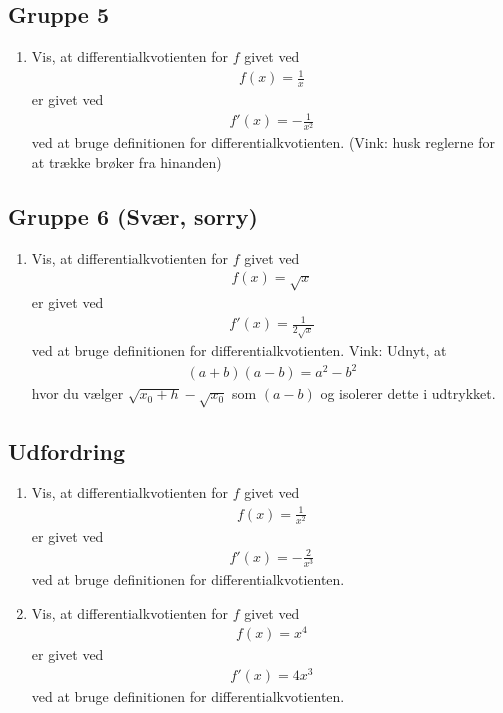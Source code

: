 \subsection*{Gruppe 5}
\begin{enumerate}[label=\roman*)]
	\item Vis, at differentialkvotienten for $f$ givet ved
	\begin{align*}
		f(x) = \frac{1}{x}
	\end{align*}
	er givet ved
	\begin{align*}
		f'(x) = -\frac{1}{x^2}
	\end{align*}
	ved at bruge definitionen for differentialkvotienten. (Vink: husk reglerne for at trække brøker 
	fra hinanden)
\end{enumerate}

\subsection*{Gruppe 6 (Svær, sorry)}
\begin{enumerate}[label=\roman*)]
	\item Vis, at differentialkvotienten for $f$ givet ved
	\begin{align*}
		f(x) = \sqrt{x}
	\end{align*}
	er givet ved
	\begin{align*}
		f'(x) = \frac{1}{2\sqrt{x}}
	\end{align*}
	ved at bruge definitionen for differentialkvotienten. Vink: Udnyt, at 
	\begin{align*}
		(a+b)(a-b) = a^2 - b^2
	\end{align*}
	hvor du	vælger $\sqrt{x_0 + h} -\sqrt{x_0}$ som $(a-b)$ og isolerer dette i udtrykket.
\end{enumerate}

\subsection*{Udfordring}
\begin{enumerate}[label=\roman*)]
	\item Vis, at differentialkvotienten for $f$ givet ved
	\begin{align*}
		f(x) = \frac{1}{x^2}
	\end{align*}
	er givet ved
	\begin{align*}
		f'(x) = -\frac{2}{x^3}
	\end{align*}
	ved at bruge definitionen for differentialkvotienten.
	\item Vis, at differentialkvotienten for $f$ givet ved
	\begin{align*}
		f(x) = x^4
	\end{align*}
	er givet ved
	\begin{align*}
		f'(x) = 4x^3
	\end{align*}
	ved at bruge definitionen for differentialkvotienten.
\end{enumerate}